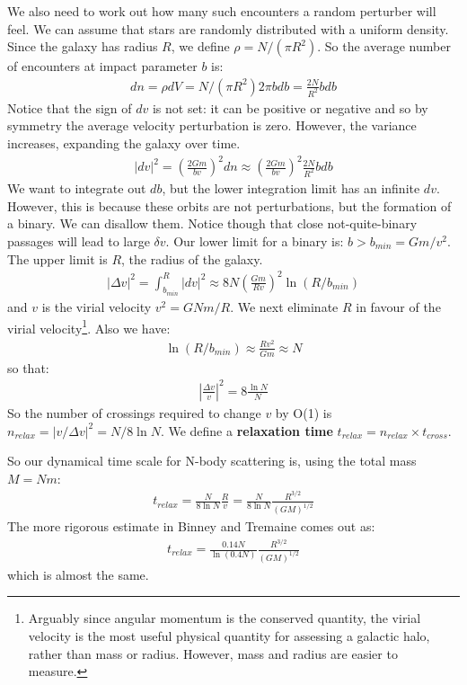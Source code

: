 \documentclass[12pt]{article}
\begin{document}
We also need to work out how many such encounters a random perturber will feel. We can assume that stars are randomly distributed with a uniform density. Since the galaxy has radius $R$, we define $\rho = N / (\pi R^2)$. So the average number of encounters at impact parameter $b$ is:
\begin{align}
 dn = \rho dV = N / (\pi R^2) 2 \pi b db = \frac{2 N}{R^2} b db
\end{align}
Notice that the sign of $dv$ is not set: it can be positive or negative and so by symmetry the average velocity perturbation is zero. However, the variance increases, expanding the galaxy over time.
\begin{align}
 |d v |^2 = \left(\frac{2 G m}{b v}\right)^2 dn \approx \left(\frac{2 G m}{b v}\right)^2 \frac{2 N}{R^2} b db
\end{align}
We want to integrate out $db$, but the lower integration limit has an infinite $dv$. However, this is because these orbits are not perturbations, but the formation of a binary. We can disallow them. Notice though that close not-quite-binary passages will lead to large $\delta v$. Our lower limit for a binary is: $b > b_{min} = G m / v^2$. The upper limit is $R$, the radius of the galaxy.
\begin{align}
 |\Delta v |^2 = \int^R_{b_{min}} |dv|^2 \approx 8 N \left(\frac{G m}{R v}\right)^2 \ln (R/b_{min})
\end{align}
and $v$ is the virial velocity $v^2 = G N m / R$. We next eliminate $R$ in favour of the virial velocity\footnote{Arguably since angular momentum is the conserved quantity, the virial velocity is the most useful physical quantity for assessing a galactic halo, rather than mass or radius. However, mass and radius are easier to measure.}. Also we have:
\begin{align}
\ln (R/b_{min}) \approx \frac{R v^2}{G m} \approx N
\end{align}
so that:
\begin{align}
 \left|\frac{\Delta v}{v} \right|^2 = 8 \frac{\ln N }{N}
\end{align}
So the number of crossings required to change $v$ by O(1) is $n_{relax} = \left|v / \Delta v \right|^2  = N / 8 \ln N$.
We define a \textbf{relaxation time} $t_{relax} = n_{relax} \times t_{cross}$.

So our dynamical time scale for N-body scattering is, using the total mass $M = Nm$:
\begin{align}
t_{relax} = \frac{N}{8 \ln N} \frac{R}{v} = \frac{N}{8 \ln N} \frac{R^{3/2}}{(G M)^{1/2}}
\end{align}
The more rigorous estimate in Binney and Tremaine comes out as:
\begin{align}
t_{relax} =\frac{ 0.14 N}{\ln (0.4 N)} \frac{R^{3/2}}{(G M)^{1/2}}
\end{align}
which is almost the same.
\end{document}
